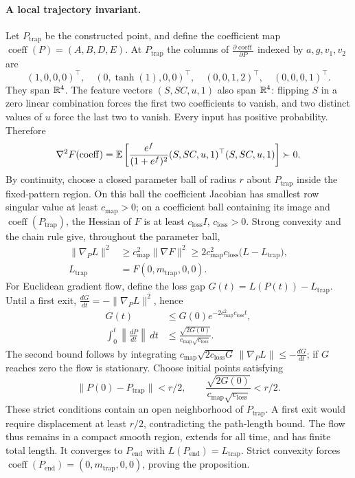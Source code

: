 \paragraph{A local trajectory invariant.}
Let $P_{\mathrm{trap}}$ be the constructed point, and define the coefficient map
$\operatorname{coeff}(P)=(A,B,D,E)$. At $P_{\mathrm{trap}}$ the columns of
$\frac{\partial\operatorname{coeff}}{\partial P}$ indexed by $a,g,v_1,v_2$ are
\[
 (1,0,0,0)^\top,\quad(0,\tanh(1),0,0)^\top,
 \quad(0,0,1,2)^\top,\quad(0,0,0,1)^\top.
\]
They span $\mathbb R^4$. The feature vectors $(S,SC,u,1)$ also span $\mathbb R^4$:
flipping $S$ in a zero linear combination forces the first two coefficients
to vanish, and two distinct values of $u$ force the last two to vanish.
Every input has positive probability. Therefore
\[
 \nabla^2 F(\operatorname{coeff})
 =\mathbb E\left[\frac{e^{f}}{(1+e^{f})^2}
 (S,SC,u,1)^\top(S,SC,u,1)\right]\succ0.
\]
By continuity, choose a closed parameter ball of radius $r$ about $P_{\mathrm{trap}}$
inside the fixed-pattern region. On this ball the coefficient Jacobian has
smallest row singular value at least $c_{\mathrm{map}}>0$; on a coefficient ball containing
its image and $\operatorname{coeff}(P_{\mathrm{trap}})$, the Hessian of $F$ is at least $c_{\mathrm{loss}} I$, $c_{\mathrm{loss}}>0$.
Strong convexity and the chain rule give, throughout the parameter ball,
\begin{equation}
\begin{aligned}
 \|\nabla_P L\|^2&\ge c_{\mathrm{map}}^2\|\nabla F\|^2
 \ge 2c_{\mathrm{map}}^2c_{\mathrm{loss}}\bigl(L-L_{\mathrm{trap}}\bigr),\\
 L_{\mathrm{trap}}&=F(0,m_{\mathrm{trap}},0,0).
\end{aligned}
 \label{eq:two-path-local-gradient}
\end{equation}
For Euclidean gradient flow, define the loss gap $G(t)=L(P(t))-L_{\mathrm{trap}}$.
Until a first exit, $\frac{dG}{dt}=-\|\nabla_P L\|^2$, hence
\[
\begin{aligned}
 G(t)&\le G(0)e^{-2c_{\mathrm{map}}^2c_{\mathrm{loss}} t},\\
 \int_0^t\left\|\frac{dP}{dt}\right\|\,dt
 &\le\frac{\sqrt{2G(0)}}{c_{\mathrm{map}}\sqrt{c_{\mathrm{loss}}}}.
\end{aligned}
\]
The second bound follows by integrating
$c_{\mathrm{map}}\sqrt{2c_{\mathrm{loss}} G}\,\|\nabla_P L\|\le-\frac{dG}{dt}$;
if $G$ reaches zero the flow is stationary.
Choose initial points satisfying
\begin{equation}
 \|P(0)-P_{\mathrm{trap}}\|<r/2,
 \qquad \frac{\sqrt{2G(0)}}{c_{\mathrm{map}}\sqrt{c_{\mathrm{loss}}}}<r/2.
 \label{eq:two-path-basin}
\end{equation}
These strict conditions contain an open neighborhood of $P_{\mathrm{trap}}$.
A first exit would require displacement at least $r/2$, contradicting
the path-length bound. The flow thus remains in a compact smooth region,
extends for all time, and has finite total length.
It converges to $P_{\mathrm{end}}$ with $L(P_{\mathrm{end}})=L_{\mathrm{trap}}$.
Strict convexity forces $\operatorname{coeff}(P_{\mathrm{end}})=(0,m_{\mathrm{trap}},0,0)$, proving the proposition.

